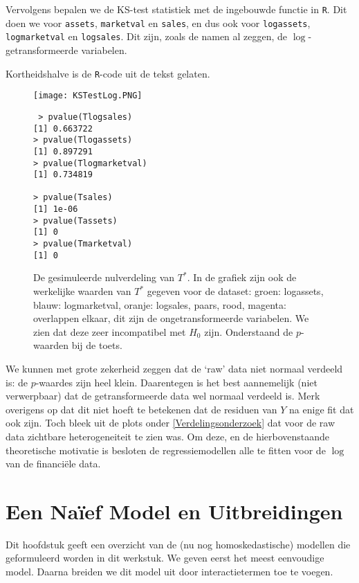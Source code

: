 \documentclass[a4paper]{report}
\begin{document}
  Vervolgens bepalen we de KS-test statistiek met de ingebouwde functie in \verb!R!. Dit doen we voor \verb!assets!, \verb!marketval! en \verb!sales!, en dus ook voor \verb!logassets!, \verb!logmarketval! en \verb!logsales!. Dit zijn, zoals de namen al zeggen, de $\log$-getransformeerde variabelen.
  
  Kortheidshalve is de \verb!R!-code uit de tekst gelaten.
  
  \begin{figure}[H]
  \begin{center}
  \texttt{[image: KSTestLog.PNG]}
  \begin{multicols}{2}
  \begin{verbatim}
 > pvalue(Tlogsales)
[1] 0.663722
> pvalue(Tlogassets)
[1] 0.897291
> pvalue(Tlogmarketval)
[1] 0.734819

> pvalue(Tsales)
[1] 1e-06
> pvalue(Tassets)
[1] 0
> pvalue(Tmarketval)
[1] 0
  \end{verbatim}
  \end{multicols}
  \end{center}
  \caption{De gesimuleerde nulverdeling van $T^*$. In de grafiek zijn ook de werkelijke waarden van $T^*$ gegeven voor de dataset: groen: logassets, blauw: logmarketval, oranje: logsales, paars, rood, magenta: overlappen elkaar, dit zijn de ongetransformeerde variabelen. We zien dat deze zeer incompatibel met $H_0$ zijn. Onderstaand de $p$-waarden bij de toets.}
  \end{figure}   
  
  We kunnen met grote zekerheid zeggen dat de `raw' data niet normaal verdeeld is: de $p$-waardes zijn heel klein. Daarentegen is het best aannemelijk (niet verwerpbaar) dat de getransformeerde data wel normaal verdeeld is. Merk overigens op dat dit niet hoeft te betekenen dat de residuen van $Y$ na enige fit dat ook zijn. Toch bleek uit de plots onder \ref{Verdelingsonderzoek} dat voor de raw data zichtbare heterogeneiteit te zien was. Om deze, en de hierbovenstaande theoretische motivatie is besloten de regressiemodellen alle te fitten voor de $\log$ van de financi\"ele data.
  
\chapter{Een Na\"ief Model en Uitbreidingen}

  Dit hoofdstuk geeft een overzicht van de (nu nog homoskedastische) modellen die geformuleerd worden in dit werkstuk. We geven eerst het meest eenvoudige model. Daarna breiden we dit model uit door interactietermen toe te voegen.
  
\end{document}
